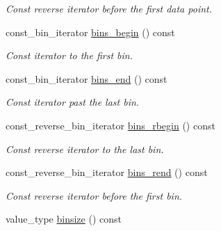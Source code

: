 \begin{DoxyCompactItemize}
\begin{DoxyCompactList}\small\item\em Const reverse iterator before the first data point. \end{DoxyCompactList}\item 
\hypertarget{a00280_a4ee0ac30f6fce5d43e518953397d7a52}{const\-\_\-bin\-\_\-iterator \hyperlink{a00280_a4ee0ac30f6fce5d43e518953397d7a52}{bins\-\_\-begin} () const }\label{a00280_a4ee0ac30f6fce5d43e518953397d7a52}

\begin{DoxyCompactList}\small\item\em Const iterator to the first bin. \end{DoxyCompactList}\item 
\hypertarget{a00280_ad2835094c088b316c772211c850dc415}{const\-\_\-bin\-\_\-iterator \hyperlink{a00280_ad2835094c088b316c772211c850dc415}{bins\-\_\-end} () const }\label{a00280_ad2835094c088b316c772211c850dc415}

\begin{DoxyCompactList}\small\item\em Const iterator past the last bin. \end{DoxyCompactList}\item 
\hypertarget{a00280_a30141b73bf05264cea359b1aea85de64}{const\-\_\-reverse\-\_\-bin\-\_\-iterator \hyperlink{a00280_a30141b73bf05264cea359b1aea85de64}{bins\-\_\-rbegin} () const }\label{a00280_a30141b73bf05264cea359b1aea85de64}

\begin{DoxyCompactList}\small\item\em Const reverse iterator to the last bin. \end{DoxyCompactList}\item 
\hypertarget{a00280_a8363835c38d2df6731d2b3cdbb6276ea}{const\-\_\-reverse\-\_\-bin\-\_\-iterator \hyperlink{a00280_a8363835c38d2df6731d2b3cdbb6276ea}{bins\-\_\-rend} () const }\label{a00280_a8363835c38d2df6731d2b3cdbb6276ea}

\begin{DoxyCompactList}\small\item\em Const reverse iterator before the first bin. \end{DoxyCompactList}\item 
\hypertarget{a00280_a1d97ebf605cbdbf9b78722d4d7617f94}{value\-\_\-type \hyperlink{a00280_a1d97ebf605cbdbf9b78722d4d7617f94}{binsize} () const }\label{a00280_a1d97ebf605cbdbf9b78722d4d7617f94}


\end{DoxyCompactItemize}
